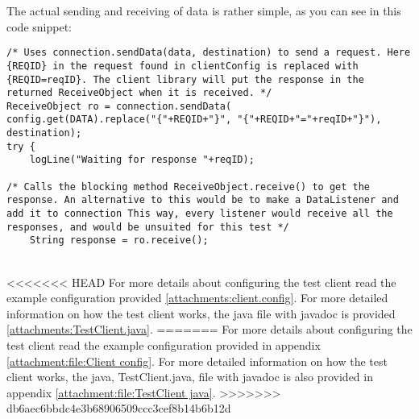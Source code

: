     The actual sending and receiving of data is rather simple, as you can see in this code snippet:
    \lstset{language=Java, style=eclipse}
    \lstset{frame=single}
    \lstset{breaklines=true}
    \lstset{showstringspaces=false}
    \begin{lstlisting}
/* Uses connection.sendData(data, destination) to send a request. Here {REQID} in the request found in clientConfig is replaced with {REQID=reqID}. The client library will put the response in the returned ReceiveObject when it is received. */
ReceiveObject ro = connection.sendData(
config.get(DATA).replace("{"+REQID+"}", "{"+REQID+"="+reqID+"}"), destination);
try {
    logLine("Waiting for response "+reqID);

/* Calls the blocking method ReceiveObject.receive() to get the response. An alternative to this would be to make a DataListener and add it to connection This way, every listener would receive all the responses, and would be unsuited for this test */
    String response = ro.receive();
    \end{lstlisting}
    \\
<<<<<<< HEAD
    For more details about configuring the test client read the example configuration provided \ref{attachments:client.config}. For more detailed information on how the test client works, the java file with javadoc is provided \ref{attachments:TestClient.java}.
=======
    For more details about configuring the test client read the example configuration provided in appendix \ref{attachment:file:Client config}. For more detailed information on how the test client works, the java, TestClient.java, file with javadoc is also provided in appendix \ref{attachment:file:TestClient java}.
>>>>>>> db6aec6bbdc4e3b68906509ccc3cef8b14b6b12d
